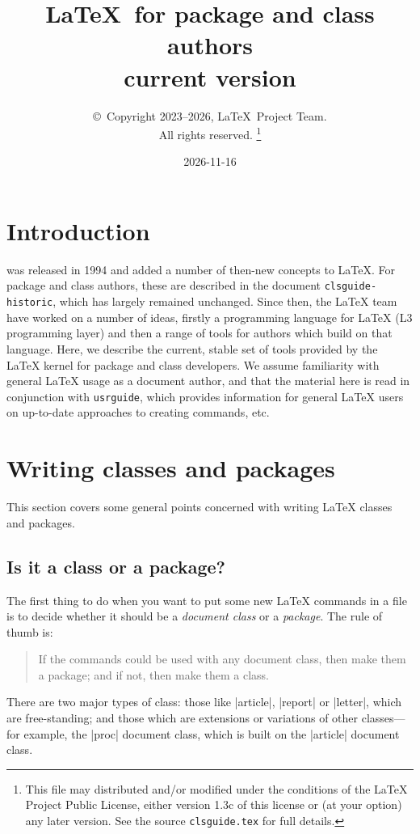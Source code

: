 \documentclass{ltxguide}
\title{\LaTeX\ for package and class authors\\current version}
\author{\copyright~Copyright 2023--2026, \LaTeX\ Project Team.\\
   All rights reserved.%
   \footnote{This file may distributed and/or modified under the
     conditions of the \LaTeX{} Project Public License, either version 1.3c
     of this license or (at your option) any later version. See the source
    \texttt{clsguide.tex} for full details.}%
}
\date{2026-11-16}
\begin{document}
\maketitle

\tableofcontents

\section{Introduction}

\LaTeXe{} was released in 1994 and added a number of then-new concepts to
\LaTeX{}. For package and class authors, these are described in the document
\texttt{clsguide-historic}, which has largely remained unchanged. Since then,
the \LaTeX{} team have worked on a number of ideas, firstly a programming
language for \LaTeX{} (L3 programming layer) and then a range of tools for
authors which build on that language. Here, we describe the current, stable set
of tools provided by the \LaTeX{} kernel for package and class developers. We
assume familiarity with general \LaTeX{} usage as a document author, and that
the material here is read in conjunction with \texttt{usrguide}, which provides
information for general \LaTeX{} users on up-to-date approaches to creating
commands, etc.

\section{Writing classes and packages}
\label{sec:writing}

This  section covers some general points concerned with writing
\LaTeX{} classes and packages.

\subsection{Is it a class or a package?}
\label{sec:classorpkg}

The first thing to do when you want to put some new \LaTeX{} commands
in a file is to decide whether it should be a \emph{document class} or a
\emph{package}.  The rule of thumb is:
\begin{quote}
  If the commands could be used with any document class, then make
  them a package; and if not, then make them a class.
\end{quote}

There are two major types of class: those like |article|, |report| or
|letter|, which are free-standing; and those which are extensions or
variations of other classes---for example, the |proc| document class,
which is built on the |article| document class.
\end{document}
